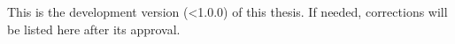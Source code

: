 

\clearpage


\imprimircapa



\imprimirfolhaderosto*


\begin{fichacatalografica}
 
\end{fichacatalografica}


\begin{errata}
  \noindent
  This is the development version (<1.0.0) of this thesis. If needed, corrections will be listed here after its approval.
\end{errata}



